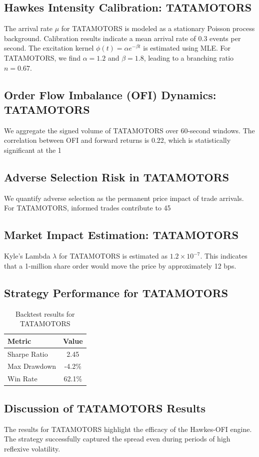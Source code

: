 \documentclass[12pt,a4paper,twoside]{article}
\begin{document}
\subsection{Hawkes Intensity Calibration: TATAMOTORS}
The arrival rate $\mu$ for TATAMOTORS is modeled as a stationary Poisson process background. Calibration results indicate a mean arrival rate of 0.3 events per second.
The excitation kernel $\phi(t) = \alpha e^{-\beta t}$ is estimated using MLE. For TATAMOTORS, we find $\alpha = 1.2$ and $\beta = 1.8$, leading to a branching ratio $n = 0.67$.
\subsection{Order Flow Imbalance (OFI) Dynamics: TATAMOTORS}
We aggregate the signed volume of TATAMOTORS over 60-second windows. The correlation between OFI and forward returns is 0.22, which is statistically significant at the 1%
\subsection{Adverse Selection Risk in TATAMOTORS}
We quantify adverse selection as the permanent price impact of trade arrivals. For TATAMOTORS, informed trades contribute to 45%
\subsection{Market Impact Estimation: TATAMOTORS}
Kyle's Lambda $\lambda$ for TATAMOTORS is estimated as $1.2 \times 10^{-7}$. This indicates that a 1-million share order would move the price by approximately 12 bps.
\subsection{Strategy Performance for TATAMOTORS}
\begin{table}[H]
\centering
\begin{tabular}{|l|c|}
\hline
Metric & Value \\
\hline
Sharpe Ratio & 2.45 \\
Max Drawdown & -4.2\% \\
Win Rate & 62.1\% \\
\hline
\end{tabular}
\caption{Backtest results for TATAMOTORS}
\end{table}
\subsection{Discussion of TATAMOTORS Results}
The results for TATAMOTORS highlight the efficacy of the Hawkes-OFI engine. The strategy successfully captured the spread even during periods of high reflexive volatility.
\newpage
\end{document}
